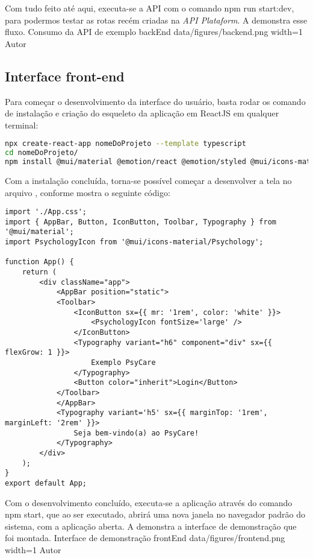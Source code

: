 Com tudo feito até aqui, executa-se a API com o comando npm run start:dev, para podermos testar as rotas recém criadas na \textit{API Plataform}. A  demonstra esse fluxo.
\image
    {Consumo da API de exemplo}
    {backEnd}
    {data/figures/backend.png}
    {width=1\textwidth}
    {Autor}

\subsection{Interface front-end}
\label{sec:frontEnd}
Para começar o desenvolvimento da interface do usuário, basta rodar os comando de instalação e criação do esqueleto da aplicação em ReactJS em qualquer terminal:
\begin{lstlisting}[language=bash]
npx create-react-app nomeDoProjeto --template typescript
cd nomeDoProjeto/
npm install @mui/material @emotion/react @emotion/styled @mui/icons-material    
\end{lstlisting}

Com a instalação concluída, torna-se possível começar a desenvolver a tela no arquivo , conforme mostra o seguinte código:
\begin{lstlisting}
import './App.css';
import { AppBar, Button, IconButton, Toolbar, Typography } from '@mui/material';
import PsychologyIcon from '@mui/icons-material/Psychology';

function App() {
    return (
        <div className="app">
            <AppBar position="static">
            <Toolbar>
                <IconButton sx={{ mr: '1rem', color: 'white' }}>
                    <PsychologyIcon fontSize='large' />
                </IconButton>
                <Typography variant="h6" component="div" sx={{ flexGrow: 1 }}>
                    Exemplo PsyCare
                </Typography>
                <Button color="inherit">Login</Button>
            </Toolbar>
            </AppBar>
            <Typography variant='h5' sx={{ marginTop: '1rem', marginLeft: '2rem' }}>
                Seja bem-vindo(a) ao PsyCare!
            </Typography>
        </div>
    );
}
export default App;
\end{lstlisting}

Com o desenvolvimento concluído, executa-se a aplicação através do comando npm start, que ao ser executado, abrirá uma nova janela no navegador padrão do sistema, com a aplicação aberta. A  demonstra a interface de demonstração que foi montada.
\image
    {Interface de demonstração}
    {frontEnd}
    {data/figures/frontend.png}
    {width=1\textwidth}
    {Autor}